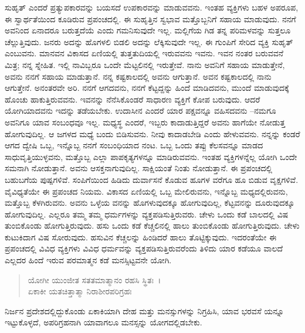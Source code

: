 ಸುಹೃತ್ ಎಂದರೆ ಪ್ರತ್ಯುಪಕಾರವನ್ನು ಬಯಸದೆ ಉಪಕಾರವನ್ನು ಮಾಡುವವನು. ಇಂತಹ ವ್ಯಕ್ತಿಗಳು ಬಹಳ ಅಪರೂಪ, ಈ ಸ್ವಾರ್ಥತೆಯಿಂದ ಕೂಡಿರುವ ಪ್ರಪಂಚದಲ್ಲಿ. ಈ ಸುಹೃತ್ತಿನ ಸ್ವಭಾವ ಮತ್ತೊಬ್ಬನಿಗೆ ಸಹಾಯ ಮಾಡುವುದು. ನನಗೆ ಅವನಿಂದ ಏನಾದರೂ ಬರುತ್ತದೆಯೆ ಎಂದು ಗಮನಿಸುವುದೇ ಇಲ್ಲ. ಮಲ್ಲಿಗೆಯ ಗಿಡ ತನ್ನ ಪರಿಮಳವನ್ನು ಸುತ್ತಲೂ ಚೆಲ್ಲುತ್ತಿವುದು. ಜನರು ಅದನ್ನು ಹೊಗಳಲಿ ಬಿಡಲಿ ಅದನ್ನು ಲೆಕ್ಕಿಸುವುದೇ ಇಲ್ಲ. ಈ ಗುಂಪಿಗೆ ಸೇರಿದ ವ್ಯಕ್ತಿ ಸುಹೃತ್ ಎಂಬುವನು. ಮಾನವನ ವಿಕಾಸದ ಏಣಿಯಲ್ಲಿ ತುತ್ತತುದಿಯಲ್ಲಿ ಇರುವವನು ಇವನು. ಇವನ ನಂತರ ಬರುವವನೆ ಮಿತ್ರ; ನನ್ನ ಸ್ನೇಹಿತ. ಇಲ್ಲಿ ನಾವಿಬ್ಬರೂ ಒಂದೇ ಮೆಟ್ಟಲಿನಲ್ಲಿ ಇರುತ್ತೇವೆ. ನಾನು ಅವನಿಗೆ ಸಹಾಯ ಮಾಡುತ್ತೇನೆ, ಅವನು ನನಗೆ ಸಹಾಯ ಮಾಡುತ್ತಾನೆ. ನನ್ನ ಕಷ್ಟಕಾಲದಲ್ಲಿ ಅವನು ಆಗುತ್ತಾನೆ. ಅವನ ಕಷ್ಟಕಾಲದಲ್ಲಿ ನಾನು ಆಗುತ್ತೇನೆ. ಅನಂತರವೇ ಅರಿ. ನನಗೆ ಆಗದವನು, ನನಗೆ ಕೆಟ್ಟದ್ದನ್ನು ಹಿಂದೆ ಮಾಡಿದವನು, ಮುಂದೆ ಮಾಡುವುದಕ್ಕೆ ಹೊಂಚು ಹಾಕುತ್ತಿರುವವನು. ಇವನನ್ನು ನೆನೆಸಿಕೊಂಡರೆ ಸಾಧಾರಣ ವ್ಯಕ್ತಿಗೆ ಕೋಪ ಬರುವುದು. ಆದರೆ ಯೋಗಿಯಾದವನು ಇದನ್ನು ತಡೆಯಬೇಕು. ಉದಾಸೀನ ಎಂದರೆ ಯಾರ ಪಕ್ಷವನ್ನೂ ವಹಿಸದವನು –ನಮಗೂ ಅವನಿಗೂ ಯಾವ ಸಂಬಂಧವೂ ಇಲ್ಲ. ಮಧ್ಯಸ್ಥ ಎಂದರೆ, ಇಬ್ಬರು ಕಾದಾಡುತ್ತಿದ್ದರೆ ಅವನು ಹಾಗೆಯೇ ನೋಡುತ್ತ ಹೋಗುವುದಿಲ್ಲ. ಆ ಜಗಳದ ಮಧ್ಯೆ ಬಂದು ಬಿಡಿಸುವನು. ನೀವು ಕಾದಾಡಬೇಡಿ ಎಂದು ಹೇಳುವವನು. ನನ್ನನ್ನು ಕಂಡರೆ ಆಗದ ದ್ವೇಷಿ ಒಬ್ಬ, ಇನ್ನೊಬ್ಬ ನನಗೆ ಸಂಬಂಧಿಯಾದ ನಂಟ. ಒಬ್ಬ ಒಂದು ತಪ್ಪು ಕೆಲಸವನ್ನೂ ಮಾಡದ ಸಾಧುವೃತ್ತಿಯುಳ್ಳವನು, ಮತ್ತೊಬ್ಬ ಎಲ್ಲಾ ಪಾಪಕೃತ್ಯಗಳನ್ನೂ ಮಾಡಿರುವವನು. ಇಂತಹ ವ್ಯಕ್ತಿಗಳನ್ನೆಲ್ಲ ಯೋಗಿ ಒಂದೇ ಸಮನಾಗಿ ನೋಡುತ್ತಾನೆ. ಅವನು ಆಸಕ್ತನಾಗುವುದಿಲ್ಲ. ಸಾಕ್ಷಿಯಂತೆ ನಿಂತು ನೋಡುತ್ತಾನೆ. ಈ ಪ್ರಪಂಚದಲ್ಲಿ ಬಹುಬಗೆಯ ಪುಷ್ಪಗಳಿವೆ. ಸಂಪಿಗೆಯಿಂದ ಹಿಡಿದು ದುರ್ವಾಸನೆ ಕೊಡುವ ಹೂಗಳ ವರೆಗೂ ಹೂ ಬಿಡುವ ವೃಕ್ಷಗಳಿವೆ. ವೈವಿಧ್ಯತೆಯೇ ಈ ಪ್ರಪಂಚದ ನಿಯಮ. ವಿಕಾಸದ ಏಣಿಯಲ್ಲಿ ಒಬ್ಬ ಮೇಲಿರುವನು, ಇನ್ನೊಬ್ಬ ಮಧ್ಯದಲ್ಲಿರುವನು, ಮತ್ತೊಬ್ಬ ಕೆಳಗಿರುವನು. ಅವನು ಒಳ್ಳೆಯ ವನನ್ನು ಹೊಗಳುವುದಕ್ಕೂ ಹೋಗುವುದಿಲ್ಲ, ಕೆಟ್ಟವನನ್ನು ದೂರುವುದಕ್ಕೂ ಹೋಗುವುದಿಲ್ಲ. ಎಲ್ಲರೂ ತಮ್ಮ ತಮ್ಮ ಧರ್ಮಗಳನ್ನು ವ್ಯಕ್ತಪಡಿಸುತ್ತಿರುವರು. ಚೇಳು ಒಂದು ಕಡೆ ಬಾಲದಲ್ಲಿ ವಿಷ ತುಂಬಿಕೊಂಡು ಹೋಗುತ್ತಿರುವುದು. ಹಸು ಒಂದು ಕಡೆ ಕೆಚ್ಚಲಿನಲ್ಲಿ ಹಾಲು ತುಂಬಿಕೊಂಡು ಹೋಗುತ್ತಿರುವುದು. ಚೇಳು ಕುಟುಕಿದಾಗ ವಿಷ ಸೋರುವುದು. ಹಸುವಿನ ಕೆಚ್ಚಲನ್ನು ಹಿಂಡಿದರೆ ಹಾಲು ತೊಟ್ಟಿಕ್ಕುವುದು. ಇದರಂತೆಯೇ ಈ ಪ್ರಪಂಚದಲ್ಲಿ ವಿವಿಧ ವ್ಯಕ್ತಿಗಳು ವಿವಿಧ ಧರ್ಮವನ್ನು ವ್ಯಕ್ತಪಡಿಸುತ್ತಿರುವರೆಂದು ತಿಳಿದು ಯಾರ ಕಡೆಯೂ ವಾಲದೆ ಎಲ್ಲದರ ಹಿಂದೆ ಇರುವ ಪರಮಾತ್ಮನ ಕಡೆ ಮನಸ್ಸಿಟ್ಟವನೇ ಯೋಗಿ.

\begin{verse}
ಯೋಗೀ ಯುಂಜೀತ ಸತತಮಾತ್ಮಾನಂ ರಹಸಿ ಸ್ಥಿತಃ~।\\ಏಕಾಕೀ ಯತಚಿತ್ತಾತ್ಮಾ ನಿರಾಶೀರಪರಿಗ್ರಹಃ 
\end{verse}

{\small ನಿರ್ಜನ ಪ್ರದೇಶದಲ್ಲಿದ್ದುಕೊಂಡು ಏಕಾಕಿಯಾಗಿ ದೇಹ ಮತ್ತು ಮನಸ್ಸುಗಳನ್ನು ನಿಗ್ರಹಿಸಿ, ಯಾವ ಭರವಸೆ ಯನ್ನೂ ಇಟ್ಟುಕೊಳ್ಳದೆ, ಅಪರಿಗ್ರಹನಾಗಿ ಯಾವಾಗಲೂ ಮನಸ್ಸನ್ನು ಯೋಗದಲ್ಲಿಡಬೇಕು.}

